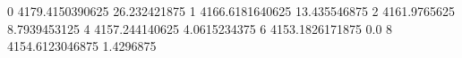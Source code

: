0 4179.4150390625 26.232421875
1 4166.6181640625 13.435546875
2 4161.9765625 8.7939453125
4 4157.244140625 4.0615234375
6 4153.1826171875 0.0
8 4154.6123046875 1.4296875
